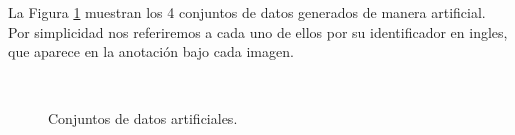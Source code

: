 La Figura \ref{fig:figure22} muestran los 4 conjuntos de datos generados de manera artificial. Por simplicidad nos referiremos a cada uno de ellos por su identificador en ingles, que aparece en la anotación bajo cada imagen.

\begin{figure}[bth]
	\myfloatalign
	\\
	\caption{Conjuntos de datos artificiales.}\label{fig:figure22}
\end{figure}

